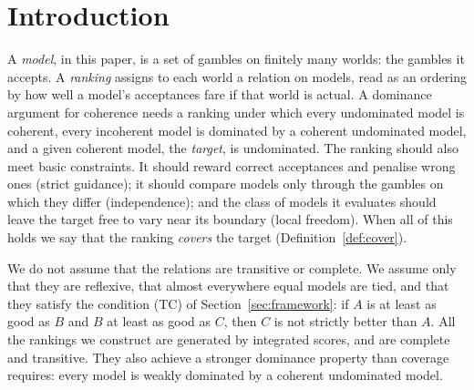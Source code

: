 \documentclass[11pt]{article}
\theoremstyle{plain}
\theoremstyle{definition}
\theoremstyle{remark}
\begin{document}
\tableofcontents

\section{Introduction}\label{sec:intro}

A \emph{model}, in this paper, is a set of gambles on finitely many worlds: the gambles it
accepts. A \emph{ranking} assigns to each world a relation on models, read as an ordering
by how well a model's acceptances fare if that world is actual. A dominance argument for
coherence needs a ranking under which every undominated model is coherent, every incoherent
model is dominated by a coherent undominated model, and a given coherent model, the
\emph{target}, is undominated. The ranking should also meet basic constraints. It should
reward correct acceptances and penalise wrong ones (strict guidance); it should compare
models only through the gambles on which they differ (independence); and the class of
models it evaluates should leave the target free to vary near its boundary (local
freedom). When all of this holds we say that the ranking \emph{covers} the target
(Definition~\ref{def:cover}).

We do not assume that the relations are transitive or complete. We assume only that they
are reflexive, that almost everywhere equal models are tied, and that they satisfy the
condition (TC) of Section~\ref{sec:framework}: if $A$ is at least as good as $B$ and $B$ at
least as good as $C$, then $C$ is not strictly better than $A$. All the rankings we
construct are generated by integrated scores, and are complete and transitive. They also
achieve a stronger dominance property than coverage requires: every model is weakly
dominated by a coherent undominated model.
\end{document}
